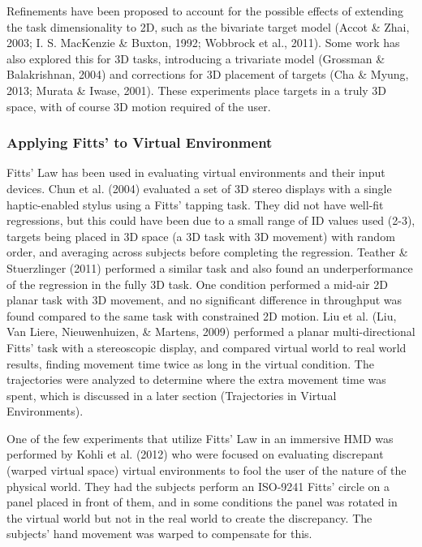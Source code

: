 Refinements have been proposed to account for the possible effects of extending the task dimensionality to 2D, such as the bivariate target model (Accot \& Zhai, 2003; I. S. MacKenzie \& Buxton, 1992; Wobbrock et al., 2011). Some work has also explored this for 3D tasks, introducing a trivariate model (Grossman \& Balakrishnan, 2004) and corrections for 3D placement of targets (Cha \& Myung, 2013; Murata \& Iwase, 2001). These experiments place targets in a truly 3D space, with of course 3D motion required of the user.

\subsubsection{Applying Fitts' to Virtual Environment}\label{applying-fitts-to-virtual-environment}

Fitts' Law has been used in evaluating virtual environments and their input devices. Chun et al. (2004) evaluated a set of 3D stereo displays with a single haptic-enabled stylus using a Fitts' tapping task. They did not have well-fit regressions, but this could have been due to a small range of ID values used (2-3), targets being placed in 3D space (a 3D task with 3D movement) with random order, and averaging across subjects before completing the regression. Teather \& Stuerzlinger (2011) performed a similar task and also found an underperformance of the regression in the fully 3D task. One condition performed a mid-air 2D planar task with 3D movement, and no significant difference in throughput was found compared to the same task with constrained 2D motion. Liu et al. (Liu, Van Liere, Nieuwenhuizen, \& Martens, 2009) performed a planar multi-directional Fitts' task with a stereoscopic display, and compared virtual world to real world results, finding movement time twice as long in the virtual condition. The trajectories were analyzed to determine where the extra movement time was spent, which is discussed in a later section (Trajectories in Virtual Environments).

One of the few experiments that utilize Fitts' Law in an immersive HMD was performed by Kohli et al. (2012) who were focused on evaluating discrepant (warped virtual space) virtual environments to fool the user of the nature of the physical world. They had the subjects perform an ISO-9241 Fitts' circle on a panel placed in front of them, and in some conditions the panel was rotated in the virtual world but not in the real world to create the discrepancy. The subjects' hand movement was warped to compensate for this.

